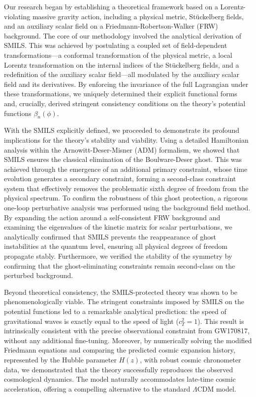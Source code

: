 \documentclass[twocolumn]{aastex631}
\begin{document}
Our research began by establishing a theoretical framework based on a Lorentz-violating massive gravity action, including a physical metric, Stückelberg fields, and an auxiliary scalar field on a Friedmann-Robertson-Walker (FRW) background. The core of our methodology involved the analytical derivation of SMILS. This was achieved by postulating a coupled set of field-dependent transformations—a conformal transformation of the physical metric, a local Lorentz transformation on the internal indices of the Stückelberg fields, and a redefinition of the auxiliary scalar field—all modulated by the auxiliary scalar field and its derivatives. By enforcing the invariance of the full Lagrangian under these transformations, we uniquely determined their explicit functional forms and, crucially, derived stringent consistency conditions on the theory's potential functions $\beta_n(\phi)$.

With the SMILS explicitly defined, we proceeded to demonstrate its profound implications for the theory's stability and viability. Using a detailed Hamiltonian analysis within the Arnowitt-Deser-Misner (ADM) formalism, we showed that SMILS ensures the classical elimination of the Boulware-Deser ghost. This was achieved through the emergence of an additional primary constraint, whose time evolution generates a secondary constraint, forming a second-class constraint system that effectively removes the problematic sixth degree of freedom from the physical spectrum. To confirm the robustness of this ghost protection, a rigorous one-loop perturbative analysis was performed using the background field method. By expanding the action around a self-consistent FRW background and examining the eigenvalues of the kinetic matrix for scalar perturbations, we analytically confirmed that SMILS prevents the reappearance of ghost instabilities at the quantum level, ensuring all physical degrees of freedom propagate stably. Furthermore, we verified the stability of the symmetry by confirming that the ghost-eliminating constraints remain second-class on the perturbed background.

Beyond theoretical consistency, the SMILS-protected theory was shown to be phenomenologically viable. The stringent constraints imposed by SMILS on the potential functions led to a remarkable analytical prediction: the speed of gravitational waves is exactly equal to the speed of light ($c_T^2=1$). This result is intrinsically consistent with the precise observational constraint from GW170817, without any additional fine-tuning. Moreover, by numerically solving the modified Friedmann equations and comparing the predicted cosmic expansion history, represented by the Hubble parameter $H(z)$, with robust cosmic chronometer data, we demonstrated that the theory successfully reproduces the observed cosmological dynamics. The model naturally accommodates late-time cosmic acceleration, offering a compelling alternative to the standard $\Lambda$CDM model.
\end{document}
